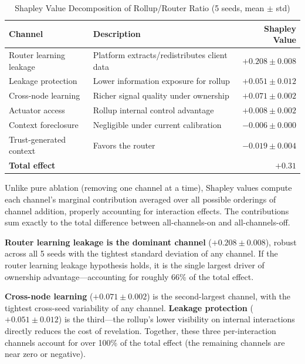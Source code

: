 \documentclass[12pt]{article}
\theoremstyle{definition}
\begin{document}
\begin{table}[H]
\centering
\caption{Shapley Value Decomposition of Rollup/Router Ratio (5 seeds, mean $\pm$ std)}
\label{tab:shapley}
\begin{tabular}{llr}
\toprule
Channel & Description & Shapley Value \\
\midrule
Router learning leakage & Platform extracts/redistributes client data & $+0.208 \pm 0.008$ \\
Leakage protection & Lower information exposure for rollup & $+0.051 \pm 0.012$ \\
Cross-node learning & Richer signal quality under ownership & $+0.071 \pm 0.002$ \\
Actuator access & Rollup internal control advantage & $+0.008 \pm 0.002$ \\
Context foreclosure & Negligible under current calibration & $-0.006 \pm 0.000$ \\
Trust-generated context & Favors the router & $-0.019 \pm 0.004$ \\
\midrule
\textbf{Total effect} & & $\mathbf{+0.31}$ \\
\bottomrule
\end{tabular}
\end{table}

Unlike pure ablation (removing one channel at a time), Shapley values compute each channel's marginal contribution averaged over all possible orderings of channel addition, properly accounting for interaction effects. The contributions sum exactly to the total difference between all-channels-on and all-channels-off.

\textbf{Router learning leakage is the dominant channel} ($+0.208 \pm 0.008$), robust across all 5 seeds with the tightest standard deviation of any channel. If the router learning leakage hypothesis holds, it is the single largest driver of ownership advantage---accounting for roughly 66\% of the total effect.

\textbf{Cross-node learning} ($+0.071 \pm 0.002$) is the second-largest channel, with the tightest cross-seed variability of any channel. \textbf{Leakage protection} ($+0.051 \pm 0.012$) is the third---the rollup's lower visibility on internal interactions directly reduces the cost of revelation. Together, these three per-interaction channels account for over 100\% of the total effect (the remaining channels are near zero or negative).
\end{document}
